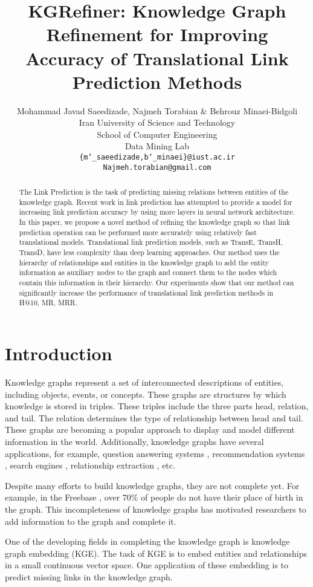 \documentclass{article} \usepackage{iclr2022_conference,times}
\title{KGRefiner: Knowledge Graph Refinement for Improving Accuracy of Translational Link Prediction Methods}
\author{Mohammad Javad Saeedizade, Najmeh Torabian \& Behrouz Minaei-Bidgoli  \\
Iran University of Science and Technology \\
School of Computer Engineering\\
Data Mining Lab\\
\texttt{\{m\char`_saeedizade,b\char`_minaei\}@iust.ac.ir} \\
\texttt{Najmeh.torabian@gmail.com} \\
}
\begin{document}
\maketitle

\begin{abstract}
The Link Prediction is the task of predicting missing relations between entities of the knowledge graph. Recent work in link prediction has attempted to provide a model for increasing link prediction accuracy by using more layers in neural network architecture. In this paper, we propose a novel method of refining the knowledge graph so that link prediction operation can be performed more accurately using relatively fast translational models. Translational link prediction models, such as TransE, TransH, TransD, have less complexity than deep learning approaches. Our method uses the hierarchy of relationships and entities in the knowledge graph to add the entity information as auxiliary nodes to the graph and connect them to the nodes which contain this information in their hierarchy. Our experiments show that our method can significantly increase the performance of translational link prediction methods in H@10, MR, MRR.
\end{abstract}

\section{Introduction}
Knowledge graphs represent a set of interconnected descriptions of entities, including objects, events, or concepts. These graphs are structures by which knowledge is stored in triples. These triples include the three parts head, relation, and tail. The relation determines the type of relationship between head and tail. These graphs are becoming a popular approach to display and model different information in the world. Additionally, knowledge graphs have several applications, for example, question answering systems \citep{qa_kg_1,qa_kg_2}, recommendation systems \citep{kb-recommender}, search engines \citep{xiong2017explicit}, relationship extraction \citep{distant_supervision2009}, etc. 

\indent Despite many efforts to build knowledge graphs, they are not complete yet. For example, in the Freebase \citep{freebase}, over 70\% of people do not have their place of birth in the graph. This incompleteness of knowledge graphs has motivated researchers to add information to the graph and complete it.

\indent One of the developing fields in completing the knowledge graph is knowledge graph embedding (KGE). The task of KGE is to embed entities and relationships in a small continuous vector space. One application of these embedding is to predict missing links in the knowledge graph.
\end{document}
